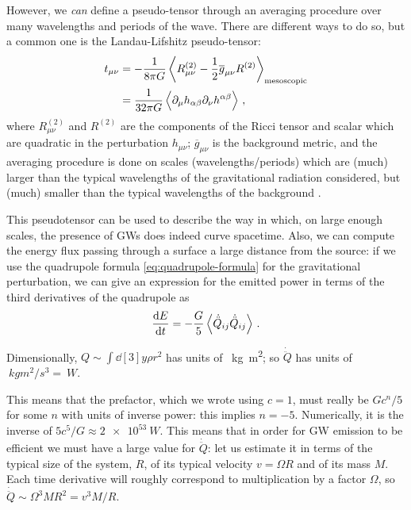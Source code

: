 \documentclass[main.tex]{subfiles}
\begin{document}
However, we \emph{can} define a pseudo-tensor through an averaging procedure over many wavelengths and periods of the wave. There are different ways to do so, but a common one is the Landau-Lifshitz pseudo-tensor: 
%
\begin{subequations}
\begin{align}
t_{\mu \nu } &= - \frac{1}{8 \pi G} \expval{R^{(2)}_{\mu \nu }- \frac{1}{2} \overline{g}_{\mu \nu } R^{(2)}}_{\text{mesoscopic}}  \\
&= \frac{1}{32 \pi G} \expval{\partial_{\mu } h_{\alpha \beta } \partial_{\nu }h^{\alpha \beta }}
\,,
\end{align}
\end{subequations}
%
where \(R^{(2)}_{\mu \nu }\) and \(R^{(2)}\) are the components of the Ricci tensor and scalar which are quadratic in the perturbation \(h_{\mu \nu }\); \(\overline{g}_{\mu \nu }\) is the background metric, and the averaging procedure is done on scales (wavelengths/periods) which are (much) larger than the typical wavelengths of the gravitational radiation considered, but (much) smaller than the typical wavelengths of the background \cite[sections 1.4.2, 1.4.3]{maggioreGravitationalWavesVolume2007}.

This pseudotensor can be used to describe the way in which, on large enough scales, the presence of \acsp{GW} does indeed curve spacetime.
Also, we can compute the energy flux passing through a surface a large distance from the source: if we use the quadrupole formula \eqref{eq:quadrupole-formula} for the gravitational perturbation, we can give an expression for the emitted power in terms of the third derivatives of the quadrupole as \cite[eq.\ 3.98]{maggioreGravitationalWavesVolume2007} 
%
\begin{align} \label{eq:energy-emission-quadrupole}
\dv{E}{t} = -\frac{G}{5} \expval{ \dot{\ddot{Q}}_{ij} \dot{\ddot{Q}}_{ij}}
\,.
\end{align}

Dimensionally, \(Q \sim \int \dd[3]{y} \rho r^2\) has units of \SI{}{kg m^2}; so \(\dot{\ddot{Q}}\) has units of \(\SI{}{kg m^2 / s^3} = \SI{}{W}\).

This means that the prefactor, which we wrote using \(c=1\), must really be \(G c^{n}/5\) for some \(n\) with units of inverse power: this implies \(n = -5\).
Numerically, it is the inverse of \(5c^{5} / G \approx \SI{2e53}{W}\). 
This means that in order for \ac{GW} emission to be efficient we must have a large value for \(\dot{\ddot{Q}}\): let us estimate it in terms of the typical size of the system, \(R\), of its typical velocity \(v = \Omega R\) and of its mass \(M\). 
Each time derivative will roughly correspond to multiplication by a factor \(\Omega \), so \(\dot{\ddot{Q}} \sim \Omega^3 M R^2 = v^3 M / R\).
\end{document}
